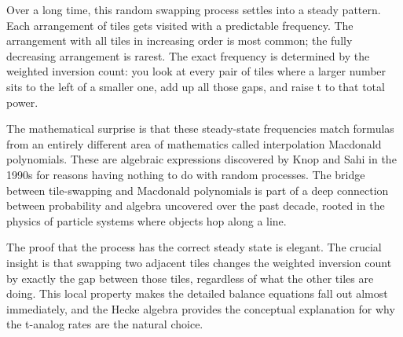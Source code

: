 Over a long time, this random swapping process settles into a steady
pattern. Each arrangement of tiles gets visited with a predictable
frequency. The arrangement with all tiles in increasing order is most
common; the fully decreasing arrangement is rarest. The exact
frequency is determined by the weighted inversion count: you look at
every pair of tiles where a larger number sits to the left of a
smaller one, add up all those gaps, and raise t to that total power.

The mathematical surprise is that these steady-state frequencies match
formulas from an entirely different area of mathematics called
interpolation Macdonald polynomials. These are algebraic expressions
discovered by Knop and Sahi in the 1990s for reasons having nothing
to do with random processes. The bridge between tile-swapping and
Macdonald polynomials is part of a deep connection between probability
and algebra uncovered over the past decade, rooted in the physics of
particle systems where objects hop along a line.

The proof that the process has the correct steady state is elegant.
The crucial insight is that swapping two adjacent tiles changes the
weighted inversion count by exactly the gap between those tiles,
regardless of what the other tiles are doing. This local property
makes the detailed balance equations fall out almost immediately,
and the Hecke algebra provides the conceptual explanation for why
the t-analog rates are the natural choice.
